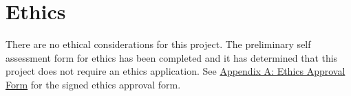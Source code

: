 \chapter{Ethics}
\label{chapter:ethics}

There are no ethical considerations for this project. The preliminary self assessment form for ethics has been completed and it has determined that this project does not require an ethics application. See \hyperlink{appendix:ethics}{Appendix A: Ethics Approval Form} for the signed ethics approval form.
